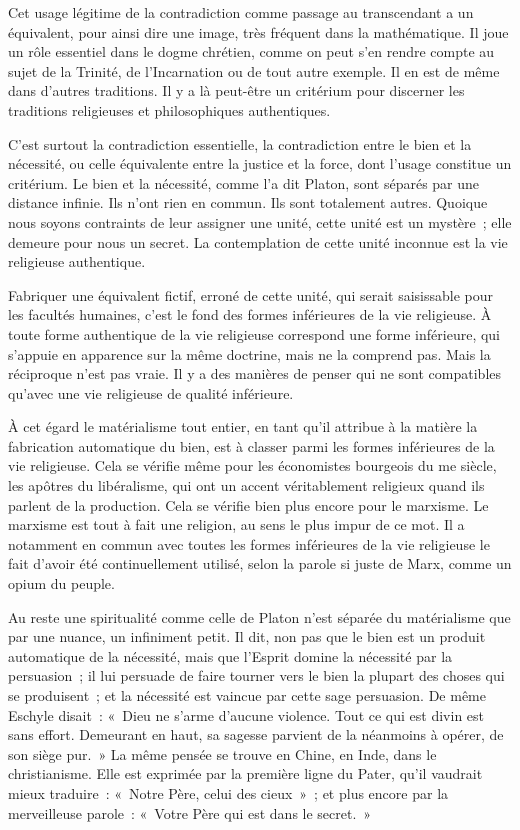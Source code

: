 \documentclass[french,twoside]{book} %
\begin{document}
Cet usage légitime de la contradiction comme passage au transcendant a un équivalent, pour ainsi dire une image, très fréquent dans la mathématique. Il joue un rôle essentiel dans le dogme chrétien, comme on peut s'en rendre compte au sujet de la Trinité, de l'Incarnation ou de tout autre exemple. Il en est de même dans d'autres traditions. Il y a là peut-être un critérium pour discerner les traditions religieuses et philosophiques authentiques.\par
C'est surtout la contradiction essentielle, la contradiction entre le bien et la nécessité, ou celle équivalente entre la justice et la force, dont l'usage constitue un critérium. Le bien et la nécessité, comme l'a dit Platon, sont séparés par une distance infinie. Ils n'ont rien en commun. Ils sont totalement autres. Quoique nous soyons contraints de leur assigner une unité, cette unité est un mystère ; elle demeure pour nous un secret. La contemplation de cette unité inconnue est la vie religieuse authentique.\par
Fabriquer une équivalent fictif, erroné de cette unité, qui serait saisissable pour les facultés humaines, c'est le fond des formes inférieures de la vie religieuse. À toute forme authentique de la vie religieuse correspond une forme inférieure, qui s'appuie en apparence sur la même doctrine, mais ne la comprend pas. Mais la réciproque n'est pas vraie. Il y a des manières de penser qui ne sont compatibles qu'avec une vie religieuse de qualité inférieure.\par
À cet égard le matérialisme tout entier, en tant qu'il attribue à la matière la fabrication automatique du bien, est à classer parmi les formes inférieures de la vie religieuse. Cela se vérifie même pour les économistes bourgeois du me siècle, les apôtres du libéralisme, qui ont un accent véritablement religieux quand ils parlent de la production. Cela se vérifie bien plus encore pour le marxisme. Le marxisme est tout à fait une religion, au sens le plus impur de ce mot. Il a notamment en commun avec toutes les formes inférieures de la vie religieuse le fait d'avoir été continuellement utilisé, selon la parole si juste de Marx, comme un opium du peuple.\par
Au reste une spiritualité comme celle de Platon n'est séparée du matérialisme que par une nuance, un infiniment petit. Il dit, non pas que le bien est un produit automatique de la nécessité, mais que l'Esprit domine la nécessité par la persuasion ; il lui persuade de faire tourner vers le bien la plupart des choses qui se produisent ; et la nécessité est vaincue par cette sage persuasion. De même Eschyle disait : « Dieu ne s'arme d'aucune violence. Tout ce qui est divin est sans effort. Demeurant en haut, sa sagesse parvient de la néanmoins à opérer, de son siège pur. » La même pensée se trouve en Chine, en Inde, dans le christianisme. Elle est exprimée par la première ligne du Pater, qu'il vaudrait mieux traduire : « Notre Père, celui des cieux » ; et plus encore par la merveilleuse parole : « Votre Père qui est dans le secret. »\par
\end{document}
